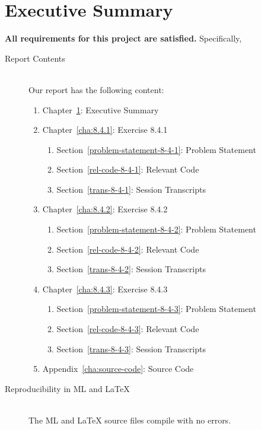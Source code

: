 \documentclass{report}
\begin{document}
\chapter{Executive Summary}
\label{cha:executive-summary}
\textbf{All requirements for this project are satisfied.}
Specifically,
\begin{description}
\item[Report Contents] \ \\
  Our report has the following content:
  \begin{enumerate}[{}]
  \item Chapter~\ref{cha:executive-summary}: Executive Summary
  \item Chapter~\ref{cha:8.4.1}: Exercise 8.4.1
    \begin{enumerate}[{}]
    \item Section~\ref{problem-statement-8-4-1}: Problem Statement
    \item Section~\ref{rel-code-8-4-1}: Relevant Code 
    \item Section~\ref{trans-8-4-1}: Session Transcripts
    \end{enumerate}
  \item Chapter~\ref{cha:8.4.2}: Exercise 8.4.2
    \begin{enumerate}[{}]
    \item Section~\ref{problem-statement-8-4-2}: Problem Statement
    \item Section~\ref{rel-code-8-4-2}: Relevant Code
    \item Section~\ref{trans-8-4-2}: Session Transcripts
    \end{enumerate}
  \item Chapter~\ref{cha:8.4.3}: Exercise 8.4.3
    \begin{enumerate}[{}]
    \item Section~\ref{problem-statement-8-4-3}: Problem Statement
    \item Section~\ref{rel-code-8-4-3}: Relevant Code
    \item Section~\ref{trans-8-4-3}: Session Transcripts
    \end{enumerate}
 \item Appendix~\ref{cha:source-code}: Source Code
  \end{enumerate}
\item[Reproducibility in ML and \LaTeX{}] \ \\
  The ML and \LaTeX{} source files compile with no errors.
\end{description}
\end{document}
